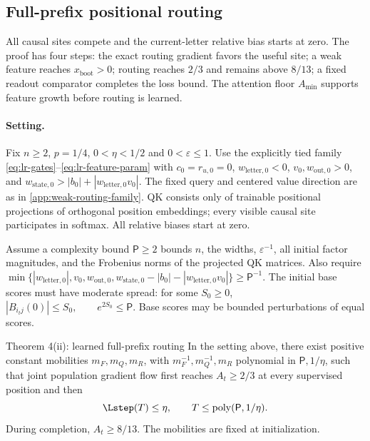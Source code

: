 \providecommand{\LRnorm}[1]{\left\lVert #1\right\rVert}
\subsection{Full-prefix positional routing}
\label{app:weak-seeded-full-prefix-routing}

All causal sites compete and the current-letter relative bias starts at zero.
The proof has four steps: the exact routing gradient favors the useful site;
a weak feature reaches $x_{\mathrm{boot}}>0$; routing reaches $2/3$ and remains
above $8/13$; a fixed readout comparator completes the loss bound.
The attention floor $A_{\min}$ supports feature growth before routing is learned.

\paragraph{Setting.}\label{app:lr-setting}
Fix $n\ge2$, $p=1/4$, $0<\eta<1/2$ and $0<\varepsilon\le1$.
Use the explicitly tied family \eqref{eq:lr-gates}--\eqref{eq:lr-feature-param}
with $c_0=r_{u,0}=0$, $w_{\mathrm{letter},0}<0$, $v_0,w_{\mathrm{out},0}>0$, and
$w_{\mathrm{state},0}>|b_0|+|w_{\mathrm{letter},0}v_0|$. The fixed query and centered value direction
are as in \cref{app:weak-routing-family}. QK consists only of trainable
positional projections of orthogonal position embeddings; every visible
causal site participates in softmax. All relative biases start at zero.

Assume a complexity bound $\mathsf P\ge2$ bounds $n$, the widths,
$\varepsilon^{-1}$, all initial factor magnitudes, and the Frobenius norms
of the projected QK matrices. Also require
 $\min\{|w_{\mathrm{letter},0}|,v_0,w_{\mathrm{out},0},w_{\mathrm{state},0}-|b_0|-|w_{\mathrm{letter},0}v_0|\}\ge \mathsf P^{-1}.$ 
The initial base scores must have moderate spread: for some $S_0\ge0$,
 $|B_{i_tj}(0)|\le S_0,\qquad e^{2S_0}\le \mathsf P.$ 
Base scores may be bounded perturbations of equal scores.

\begin{restated}{Theorem 4(ii): learned full-prefix routing}
In the setting above, there exist positive constant mobilities
$m_F,m_Q,m_R$, with $m_F^{-1},m_Q^{-1},m_R$
polynomial in $\mathsf P,1/\eta$, such that joint population gradient flow first
reaches $A_t\ge2/3$ at every supervised position and then
\begin{equation}\label{eq:lr-finite-theorem}
 \Lstep(T)\le \eta,\qquad T\le\operatorname{poly}(\mathsf P,1/\eta).
\end{equation}
During completion, $A_t\ge8/13$. The mobilities are fixed at initialization.
\end{restated}

